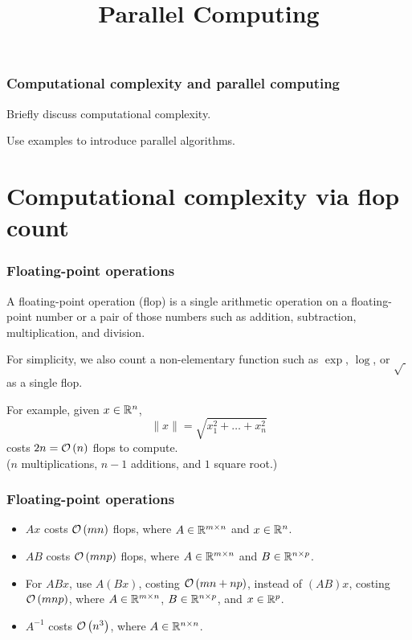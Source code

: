 \documentclass[10pt,mathserif]{beamer}
\title{\large \bfseries Parallel Computing}
\begin{document}
\frame{
\thispagestyle{empty}
\titlepage
}

\begin{frame}
\frametitle{Computational complexity and parallel computing}

Briefly discuss computational complexity. 
\vspace{0.2in}

Use examples to introduce parallel algorithms. 

\end{frame}


\section{Computational complexity via flop count}

\begin{frame}
\frametitle{Floating-point operations}
A floating-point operation (flop) is a single arithmetic operation on a floating-point number or a pair of those numbers such as addition, subtraction, multiplication, and division.

\vspace{0.2in}
For simplicity, we also count a non-elementary function such as $\exp{}$, $\log{}$, or $\sqrt{~}$ as a single flop.

\vspace{0.2in}\pause
For example, given $x\in \mathbb{R}^n$,
\[
\|x\|=\sqrt{x_1^2+\dots+x_n^2}
\]
costs $2n={\mathcal{O}\left(n\right)}$ flops to compute. \\
($n$ multiplications, $n-1$ additions, and $1$ square root.)
\end{frame}



\begin{frame}
\frametitle{Floating-point operations}
\begin{itemize}
\item
$Ax$ costs ${\mathcal{O}\left(mn\right)}$ flops, where $A\in \mathbb{R}^{m\times n}$ and $x\in \mathbb{R}^n$.
\item
$AB$ costs ${\mathcal{O}\left(mnp\right)}$ flops, where $A\in \mathbb{R}^{m\times n}$ and $B\in \mathbb{R}^{n\times p}$.
\item
For $ABx$, use  $A(Bx)$, costing ${\mathcal{O}\left(mn+np\right)}$, instead of $(AB)x$, costing ${\mathcal{O}\left(mnp\right)}$,
 where $A\in \mathbb{R}^{m\times n}$, $B\in \mathbb{R}^{n\times p}$, and $x\in \mathbb{R}^{p}$.
\item
$A^{-1}$ costs ${\mathcal{O}\left(n^3\right)}$, where $A\in \mathbb{R}^{n\times n}$.
\end{itemize}
\end{frame}
\end{document}

